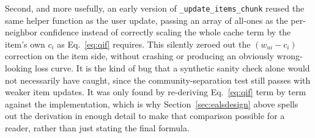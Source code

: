 \medskip
Second, and more usefully, an early version of \texttt{\_update\_items\_chunk}
reused the same helper function as the user update, passing an array of
all-ones as the per-neighbor confidence instead of correctly scaling the
whole cache term by the item's own $c_i$ as Eq.~\ref{eq:qif} requires. This
silently zeroed out the $(w_{ui}-c_i)$ correction on the item side, without
crashing or producing an obviously wrong-looking loss curve. It is the
kind of bug that a synthetic sanity check alone would not necessarily have
caught, since the community-separation test still passes with weaker item
updates. It was only found by re-deriving Eq.~\ref{eq:qif} term by term
against the implementation, which is why Section~\ref{sec:ealsdesign}
above spells out the derivation in enough detail to make that comparison
possible for a reader, rather than just stating the final formula.
